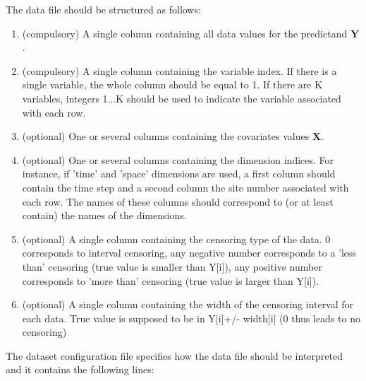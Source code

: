 \documentclass[a4paper]{article}
\begin{document}
	The data file should be structured as follows:
		
	\begin{enumerate}
		\item (compulsory) A single column containing all data values for the predictand $\boldsymbol{Y}$.
		\item (compulsory) A single column containing the variable index.  If there is a single variable, the whole column should be equal to 1. If there are K variables, integers 1...K should be used to indicate the variable associated with each row.
		\item (optional) One or several columns containing the covariates values $\boldsymbol{X}$.
		\item (optional) One or several columns containing the dimension indices. For instance, if 'time' and 'space' dimensions are used, a first column should contain the time step and a second column the site number associated with each row. The names of these columns should correspond to (or at least contain) the names of the dimensions.
		\item (optional) A single column containing the censoring type of the data. 0 corresponds to interval censoring, any negative number corresponds to a 'less than' censoring (true value is smaller than Y[i]), any positive number corresponds to 'more than' censoring (true value is larger than Y[i]).
		\item (optional) A single column containing the width of the censoring interval for each data. True value is supposed to be in Y[i]+/- width[i] (0 thus leads to no censoring)
	\end{enumerate}
	
	The dataset configuration file specifies how the data file should be interpreted and it contains the following lines:
		
\end{document}

